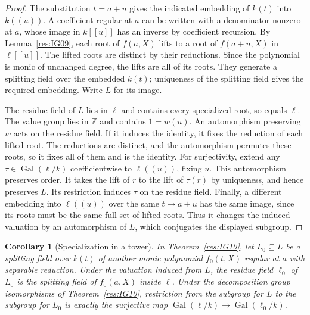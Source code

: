 \documentclass[11pt,oneside,openany]{book}
\newtheorem{corollary}[theorem]{Corollary}
\theoremstyle{definition}
\theoremstyle{remark}
\begin{document}
\begin{proof}
The substitution \(t=a+u\) gives the indicated embedding of
\(k(t)\) into \(k((u))\). A coefficient regular at \(a\) can be
written with a denominator nonzero at \(a\), whose image in
\(k[[u]]\) has an inverse by coefficient recursion.
By Lemma~\ref{res:IG09}, each root of \(f(a,X)\) lifts to a root
of \(f(a+u,X)\) in \(\ell[[u]]\). The lifted roots are distinct
by their reductions. Since the polynomial is monic of unchanged
degree, the lifts are all of its roots. They generate a splitting
field over the embedded \(k(t)\); uniqueness of the splitting field
gives the required embedding. Write \(L\) for its image.

The residue field of \(L\) lies in \(\ell\) and contains every
specialized root, so equals \(\ell\). The value group lies in
\(\mathbb Z\) and contains \(1=w(u)\). An automorphism preserving
\(w\) acts on the residue field. If it induces the identity, it
fixes the reduction of each lifted root. The reductions are distinct,
and the automorphism permutes these roots, so it fixes all of them
and is the identity. For surjectivity, extend any
\(\tau\in\operatorname{Gal}(\ell/k)\) coefficientwise to
\(\ell((u))\), fixing \(u\). This automorphism preserves order.
It takes the lift of \(r\) to the lift of \(\tau(r)\) by uniqueness,
and hence preserves \(L\). Its restriction induces \(\tau\) on
the residue field. Finally, a different embedding into
\(\ell((u))\) over the same \(t\mapsto a+u\) has the same image,
since its roots must be the same full set of lifted roots.
Thus it changes the induced valuation by an automorphism of \(L\),
which conjugates the displayed subgroup.
\end{proof}

\begin{corollary}[Specialization in a tower]
\label{res:IG11}
In Theorem~\ref{res:IG10}, let \(L_0\subseteq L\) be a splitting
field over \(k(t)\) of another monic polynomial \(f_0(t,X)\)
regular at \(a\) with separable reduction. Under the valuation
induced from \(L\), the residue field \(\ell_0\) of \(L_0\) is
the splitting field of \(f_0(a,X)\) inside \(\ell\).
Under the decomposition group isomorphisms of
Theorem~\ref{res:IG10}, restriction from the subgroup for \(L\)
to the subgroup for \(L_0\) is exactly the surjective map
\(\operatorname{Gal}(\ell/k)\to\operatorname{Gal}(\ell_0/k)\).
\end{corollary}
\end{document}
